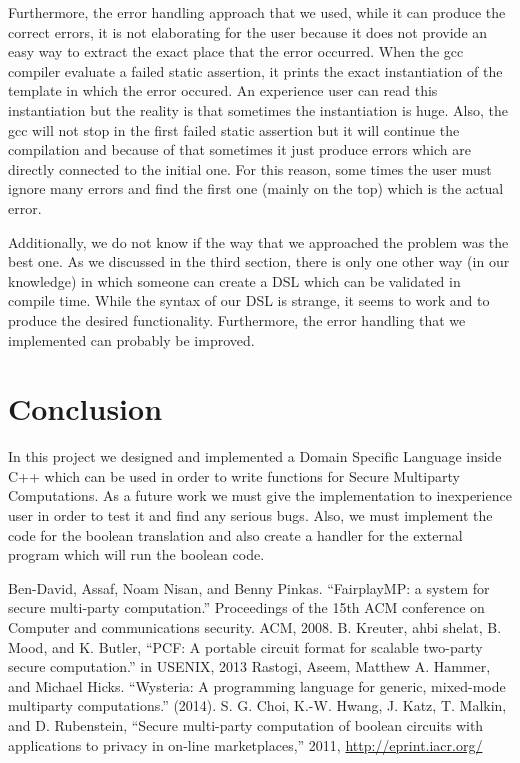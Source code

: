 \documentclass[paper=a4, fontsize=11pt]{scrartcl} %
\numberwithin{equation}{section} %
\numberwithin{figure}{section} %
\numberwithin{table}{section} %
\begin{document}
Furthermore, the error handling approach that we used, while it can produce the correct errors, it is not elaborating for the user because it does not provide an easy way to extract the exact place that the error occurred. When the gcc compiler evaluate a failed static assertion, it prints the exact instantiation of the template in which the error occured. An experience user can read this instantiation but the reality is that sometimes the instantiation is huge. Also, the gcc will not stop in the first failed static assertion but it will continue the compilation and because of that sometimes it just produce errors which are directly connected to the initial one. For this reason, some times the user must ignore many errors and find the first one (mainly on the top) which is the actual error.

Additionally, we do not know if the way that we approached the problem was the best one. As we discussed in the third section, there is only one other way (in our knowledge) in which someone can create a DSL which can be validated in compile time. While the syntax of our DSL is strange, it seems to work and to produce the desired functionality. Furthermore, the error handling that we implemented can probably be improved. 

\section{Conclusion}
In this project we designed and implemented a Domain Specific Language inside C++ which can be used in order to write functions for Secure Multiparty Computations. As a future work we must give the implementation to inexperience user in order to test it and find any serious bugs. Also, we must implement the code for the boolean translation and also create a handler for the external program which will run the boolean code. 



\begin{thebibliography}{9}
Ben-David, Assaf, Noam Nisan, and Benny Pinkas. ``FairplayMP: a system for secure multi-party computation.'' Proceedings of the 15th ACM conference on Computer and communications security. ACM, 2008.
 B. Kreuter, ahbi shelat, B. Mood, and K. Butler, ``PCF: A portable
circuit format for scalable two-party secure computation.'' in USENIX,
2013
Rastogi, Aseem, Matthew A. Hammer, and Michael Hicks. ``Wysteria: A programming language for generic, mixed-mode multiparty computations.'' (2014).
S. G. Choi, K.-W. Hwang, J. Katz, T. Malkin, and D. Rubenstein,
“Secure multi-party computation of boolean circuits with applications to
privacy in on-line marketplaces,” 2011, \url{http://eprint.iacr.org/}
\end{thebibliography}
\end{document}
